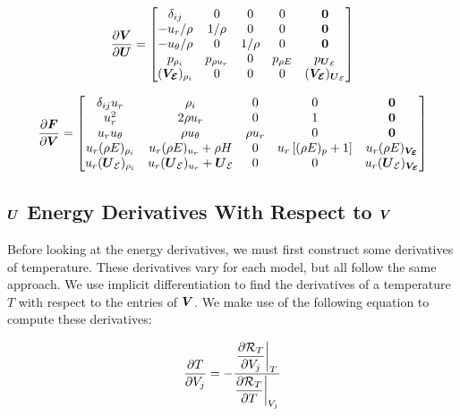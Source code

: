 \documentclass[10pt]{article}
\begin{document}
\begin{flushleft}
\begin{equation}
    \frac{\partial \boldsymbol{V}}{\partial \boldsymbol{U}} = \begin{bmatrix}
        \delta_{ij} & 0 & 0 & 0 & \boldsymbol{0} \\
        - u_r / \rho & 1 / \rho & 0 & 0 & \boldsymbol{0} \\
        - u_\theta / \rho & 0 & 1 / \rho & 0 & \boldsymbol{0} \\
        p_{\rho_i} & p_{\rho u_r} & 0 & p_{\rho E} & p_{\boldsymbol{U}_{\mathcal{E}}} \\ 
        (\boldsymbol{V_{\mathcal{E}}})_{\rho_i} & 0 & 0 & 0 & (\boldsymbol{V_{\mathcal{E}}})_{\boldsymbol{U}_{\mathcal{E}}}
    \end{bmatrix}
\end{equation}

\begin{equation*}
    \frac{\partial \boldsymbol{F}}{\partial \boldsymbol{V}} = \begin{bmatrix}
        \delta_{ij} u_r & \rho_i & 0 & 0 & \boldsymbol{0} \\
        u_r^2 & 2 \rho u_r & 0 & 1 & \boldsymbol{0} \\
        u_r u_\theta & \rho u_\theta & \rho u_r & 0 & \boldsymbol{0} \\
        u_r (\rho E)_{\rho_i} & u_r (\rho E)_{u_r} + \rho H & 0 & u_r \left[ (\rho E)_p + 1 \right] & u_r (\rho E)_{\boldsymbol{V_{\mathcal{E}}}} \\
        u_r (\boldsymbol{U}_{\mathcal{E}})_{\rho_i} & u_r(\boldsymbol{U}_{\mathcal{E}})_{u_r} + \boldsymbol{U}_{\mathcal{E}} & 0 & 0 & u_r (\boldsymbol{U}_{\mathcal{E}})_{\boldsymbol{V_{\mathcal{E}}}}
    \end{bmatrix}
\end{equation*}


\subsection{$\boldsymbol{U}$ Energy Derivatives With Respect to $\boldsymbol{V}$}

Before looking at the energy derivatives, we must first construct some derivatives of temperature. These derivatives vary for each model, but all follow the same approach. We use implicit differentiation to find the derivatives of a temperature $T$ with respect to the entries of $\boldsymbol{V}$. We make use of the following equation to compute these derivatives:

\begin{equation}
    \frac{\partial T}{\partial V_j} = - \frac{ \displaystyle \frac{\partial \mathcal{R}_T}{\partial V_j} \bigg|_T}{ \displaystyle \frac{\partial \mathcal{R}_T}{\partial T} \bigg|_{V_j}}
\end{equation}


\end{flushleft}
\end{document}
